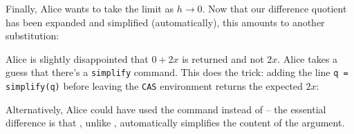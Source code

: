 \documentclass{article}
\begin{document}
Finally, Alice wants to take the limit as $h\to 0$. Now that our difference quotient has been expanded and simplified (automatically), this amounts to another substitution:
Alice is slightly disappointed that $0+2x$ is returned and not $2x$. Alice takes a guess that there's a \texttt{simplify} command. This does the trick: adding the line \texttt{q = simplify(q)} before leaving the \texttt{CAS} environment returns the expected $2x$:

Alternatively, Alice could have used the \texttt{\print*} command instead of \texttt{\print} -- the essential difference is that \texttt{\print*}, unlike \texttt{\print}, automatically simplifies the content of the argument. 
\end{document}
